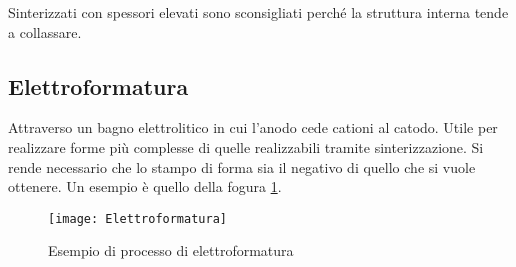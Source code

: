 Sinterizzati con spessori elevati sono sconsigliati perché la struttura interna tende a collassare.

\subsection{Elettroformatura}
Attraverso un bagno elettrolitico in cui l'anodo cede cationi al catodo.
Utile per realizzare forme più complesse di quelle realizzabili tramite sinterizzazione. Si rende necessario che lo stampo di forma sia il negativo di quello che si vuole ottenere.
Un esempio è quello della fogura \ref{fig:Elettroformatura}.

\begin{figure}
\centering
\texttt{[image: Elettroformatura]}
\caption{Esempio di processo di elettroformatura}
\label{fig:Elettroformatura}
\end{figure}